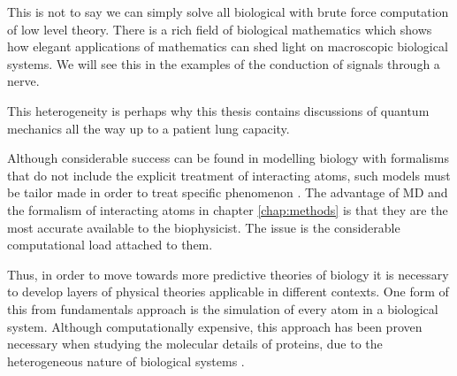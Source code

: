 This is not to say we can simply solve all biological with brute force computation of low level theory. There is a rich field of biological mathematics which shows how elegant applications of mathematics can shed light on macroscopic biological systems. We will see this in the examples of the conduction of signals through a nerve. 

This heterogeneity is perhaps why this thesis contains discussions of quantum mechanics all the way up to a patient lung capacity.


Although considerable success can be found in modelling biology with formalisms that do not include the explicit treatment of interacting atoms, such models must be tailor made in order to treat specific phenomenon \cite{phillips2012}. The advantage of MD and the formalism of interacting atoms in chapter \ref{chap:methods} is that they are the most accurate available to the biophysicist. The issue is the considerable computational load attached to them. 

Thus, in order to move towards more predictive theories of biology it is necessary to develop layers of physical theories applicable in different contexts. One form of this from fundamentals approach is the simulation of every atom in a biological system. Although computationally expensive, this approach has been proven necessary when studying the molecular details of proteins, due to the heterogeneous nature of biological systems \cite{moy2000, corry2000}. 





